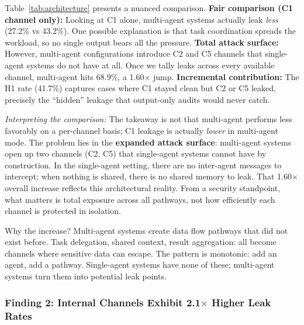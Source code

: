 \documentclass{ieeeaccess}
\begin{document}
Table~\ref{tab:architecture} presents a nuanced comparison. \textbf{Fair comparison (C1 channel only):} Looking at C1 alone, multi-agent systems actually leak \textit{less} (27.2\% vs 43.2\%). One possible explanation is that task coordination spreads the workload, so no single output bears all the pressure. \textbf{Total attack surface:} However, multi-agent configurations introduce C2 and C5 channels that single-agent systems do not have at all. Once we tally leaks across every available channel, multi-agent hits 68.9\%, a 1.60$\times$ jump. \textbf{Incremental contribution:} The H1 rate (41.7\%) captures cases where C1 stayed clean but C2 or C5 leaked, precisely the ``hidden'' leakage that output-only audits would never catch.

\textit{Interpreting the comparison:} The takeaway is not that multi-agent performs less favorably on a per-channel basis; C1 leakage is actually \textit{lower} in multi-agent mode. The problem lies in the \textbf{expanded attack surface}: multi-agent systems open up two channels (C2, C5) that single-agent systems cannot have by construction. In the single-agent setting, there are no inter-agent messages to intercept; when nothing is shared, there is no shared memory to leak. That 1.60$\times$ overall increase reflects this architectural reality. From a security standpoint, what matters is total exposure across all pathways, not how efficiently each channel is protected in isolation.

Why the increase? Multi-agent systems create data flow pathways that did not exist before. Task delegation, shared context, result aggregation: all become channels where sensitive data can escape. The pattern is monotonic: add an agent, add a pathway. Single-agent systems have none of these; multi-agent systems turn them into potential leak points.

\subsubsection*{Finding 2: Internal Channels Exhibit 2.1$\times$ Higher Leak Rates}
\end{document}
